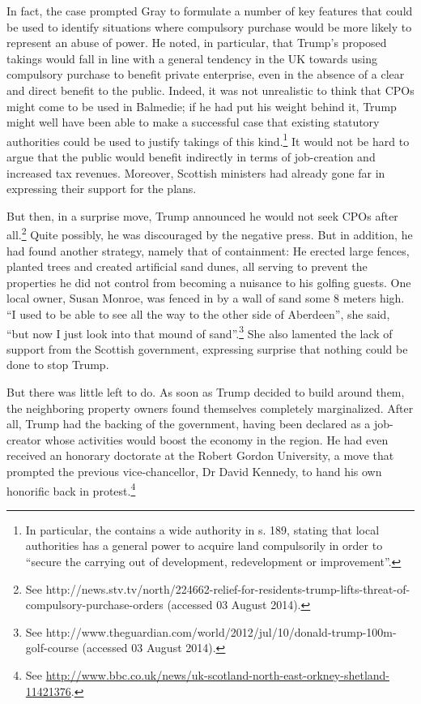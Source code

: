 \documentclass[12pt,a4paper]{book} %
\begin{document}
In fact, the case prompted Gray to formulate a number of key features that could be used to identify situations where compulsory purchase would be more likely to represent an abuse of power. He noted, in particular, that Trump's proposed takings would fall in line with a general tendency in the UK towards using compulsory purchase to benefit private enterprise, even in the absence of a clear and direct benefit to the public. Indeed, it was not unrealistic to think that CPOs might come to be used in Balmedie; if he had put his weight behind it, Trump might well have been able to make a successful case that existing statutory authorities could be used to justify takings of this kind.\footnote{In particular, the \cite{tcpsa97} contains a wide authority in s. 189, stating that local authorities has a general power to acquire land compulsorily in order to ``secure the carrying out of development, redevelopment or improvement''.} It would not be hard to argue that the public would benefit indirectly in terms of job-creation and increased tax revenues. Moreover, Scottish ministers had already gone far in expressing their support for the plans.

But then, in a surprise move, Trump announced he would not seek CPOs after all.\footnote{See http://news.stv.tv/north/224662-relief-for-residents-trump-lifts-threat-of-compulsory-purchase-orders (accessed 03 August 2014).} Quite possibly, he was discouraged by the negative press. But in addition, he had found another strategy, namely that of containment: He erected large fences, planted trees and created artificial sand dunes, all serving to prevent the properties he did not control from becoming a nuisance to his golfing guests. One local owner, Susan Monroe, was fenced in by a wall of sand some 8 meters high. ``I used to be able to see all the way to the other side of Aberdeen'', she said, ``but now I just look into that mound of sand''.\footnote{See http://www.theguardian.com/world/2012/jul/10/donald-trump-100m-golf-course (accessed 03 August 2014).} She also lamented the lack of support from the Scottish government, expressing surprise that nothing could be done to stop Trump.

But there was little left to do. As soon as Trump decided to build around them, the neighboring property owners found themselves completely marginalized. After all, Trump had the backing of the government, having been declared as a job-creator whose activities would boost the economy in the region. He had even received an honorary doctorate at the Robert Gordon University, a move that prompted the previous vice-chancellor, Dr David Kennedy, to hand his own honorific back in protest.\footnote{See \url{http://www.bbc.co.uk/news/uk-scotland-north-east-orkney-shetland-11421376}.}
\end{document}
